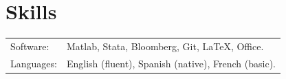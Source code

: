 \documentclass[12pt]{article}
\newcommand{\vsect}{\vspace{0.08cm}}
\begin{document}
	
	\section{Skills} 
	\vsect
	\begin{tabular}[l]{ll}
		Software:  & Matlab, Stata, Bloomberg, Git, \LaTeX, Office. \\ %
		Languages: & English (fluent), Spanish (native), French (basic). \\
	\end{tabular}
	
	
	
\end{document}

